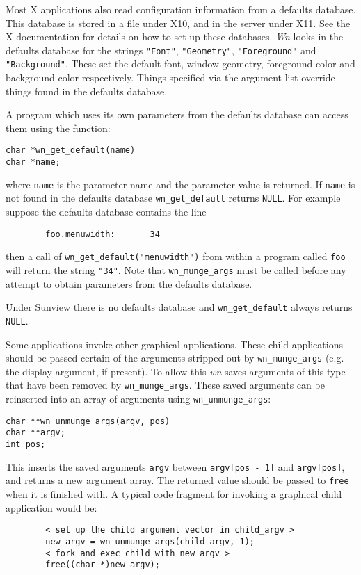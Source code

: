 Most X applications also read configuration information from a defaults
database.
This database is stored in a file under X10, and in the server under X11.
See the X documentation for details on how to set up these databases.
{\em Wn} looks in the defaults database for the strings {\tt "Font"},
{\tt "Geometry"}, {\tt "Foreground"} and {\tt "Background"}.
These set the default font, window geometry, foreground color and
background color respectively.
Things specified via the argument list override things found in the
defaults database.

A program which uses its own parameters from the defaults database can
access them using the function:
\begin{verbatim}
char *wn_get_default(name)
char *name;
\end{verbatim}
where {\tt name} is the parameter name and the parameter value is returned.
If {\tt name} is not found in the defaults database {\tt wn\_get\_default}
returns {\tt NULL}.
For example suppose the defaults database contains the line
\begin{verbatim}
        foo.menuwidth:       34
\end{verbatim}
then a call of {\tt wn\_get\_default("menuwidth")} from within a program called
{\tt foo} will return the string {\tt "34"}. Note that {\tt wn\_munge\_args}
must be called before any attempt to obtain parameters from the defaults
database.

Under Sunview there is no defaults database and {\tt wn\_get\_default}
always returns {\tt NULL}.

Some applications invoke other graphical applications.
These child applications should be passed certain of the arguments
stripped out by {\tt wn\_munge\_args} (e.g. the display argument, if present).
To allow this {\em wn} saves arguments of this type that have been
removed by {\tt wn\_munge\_args}.  These saved arguments can be reinserted
into an array of arguments using {\tt wn\_unmunge\_args}:
\begin{verbatim}
char **wn_unmunge_args(argv, pos)
char **argv;
int pos;
\end{verbatim}
This inserts the saved arguments {\tt argv} between {\tt argv[pos - 1]}
and {\tt argv[pos]}, and returns a new argument array.
The returned value should be passed to {\tt free} when it is finished with.
A typical code fragment for invoking a graphical child application
would be:
\begin{verbatim}
        < set up the child argument vector in child_argv >
        new_argv = wn_unmunge_args(child_argv, 1);
        < fork and exec child with new_argv >
        free((char *)new_argv);
\end{verbatim}
